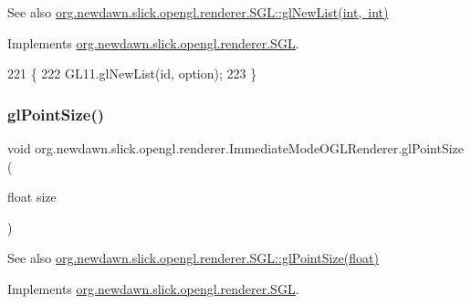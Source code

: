 \begin{DoxySeeAlso}{See also}
\mbox{\hyperlink{interfaceorg_1_1newdawn_1_1slick_1_1opengl_1_1renderer_1_1_s_g_l_a85746cd7e0de9297a821619097a5f7cc}{org.\+newdawn.\+slick.\+opengl.\+renderer.\+S\+G\+L\+::gl\+New\+List(int, int)}} 
\end{DoxySeeAlso}


Implements \mbox{\hyperlink{interfaceorg_1_1newdawn_1_1slick_1_1opengl_1_1renderer_1_1_s_g_l_a85746cd7e0de9297a821619097a5f7cc}{org.\+newdawn.\+slick.\+opengl.\+renderer.\+S\+GL}}.


\begin{DoxyCode}
221                                               \{
222         GL11.glNewList(\textcolor{keywordtype}{id}, option);
223     \}
\end{DoxyCode}
\mbox{\label{classorg_1_1newdawn_1_1slick_1_1opengl_1_1renderer_1_1_immediate_mode_o_g_l_renderer_a94ff70b3e1685df7109524b1a6e10b9c}} 
\subsubsection{\texorpdfstring{gl\+Point\+Size()}{glPointSize()}}
{\footnotesize\ttfamily void org.\+newdawn.\+slick.\+opengl.\+renderer.\+Immediate\+Mode\+O\+G\+L\+Renderer.\+gl\+Point\+Size (\begin{DoxyParamCaption}\item[{float}]{size }\end{DoxyParamCaption})\hspace{0.3cm}{\ttfamily [inline]}}

\begin{DoxySeeAlso}{See also}
\mbox{\hyperlink{interfaceorg_1_1newdawn_1_1slick_1_1opengl_1_1renderer_1_1_s_g_l_a29b20d7b222979b3edb3f069db9ec467}{org.\+newdawn.\+slick.\+opengl.\+renderer.\+S\+G\+L\+::gl\+Point\+Size(float)}} 
\end{DoxySeeAlso}


Implements \mbox{\hyperlink{interfaceorg_1_1newdawn_1_1slick_1_1opengl_1_1renderer_1_1_s_g_l_a29b20d7b222979b3edb3f069db9ec467}{org.\+newdawn.\+slick.\+opengl.\+renderer.\+S\+GL}}.


